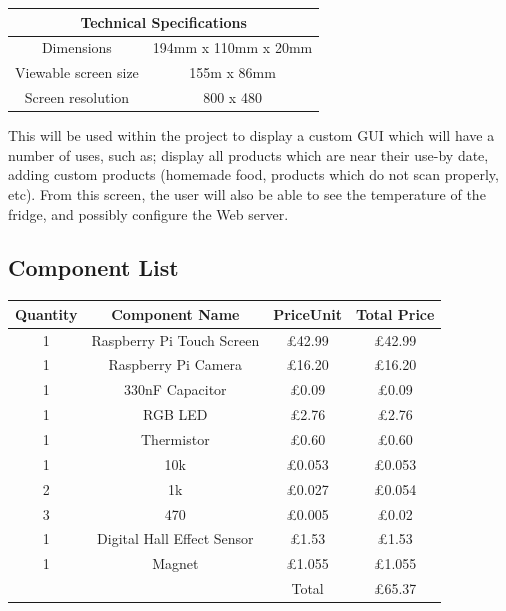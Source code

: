 \documentclass[10pt]{article}
\begin{document}
{\begin{center}
	\begin{tabular}{ | c | c | }
		\hline
	 	\multicolumn{2}{|c|}{Technical Specifications} \\ \hline
		Dimensions 		& 194mm x 110mm x 20mm \\ \hline
		Viewable screen size 	& 155m x 86mm \\ \hline
		Screen resolution	& 800 x 480 \\ \hline
	\end{tabular}
\end{center}

This will be used within the project to display a custom GUI which will have a number of uses, such as; display all products which are near their use-by date, adding custom products (homemade food, products which do not scan properly, etc). From this screen, the user will also be able to see the temperature of the fridge, and possibly configure the Web server.

\subsection{Component List}
\begin{center}
	\begin{tabular}{ | c | c | c | c |}
		\hline
	 	Quantity & Component Name & PriceUnit & Total Price \\ \hline
		1	& Raspberry Pi Touch Screen 	& \pounds 42.99	& \pounds 42.99 \\ \hline
		1 	& Raspberry Pi Camera 	& \pounds 16.20	& \pounds 16.20 \\ \hline
		1	& 330nF Capacitor	& \pounds 0.09	& \pounds 0.09 \\ \hline
		1	& RGB LED   & \pounds 2.76	& \pounds 2.76 \\ \hline
		1	& Thermistor	& \pounds 0.60	& \pounds 0.60 \\ \hline
		1	& 10k\ohm & \pounds 0.053 	& \pounds 0.053 \\ \hline
		2	& 1k\ohm & \pounds 0.027	& \pounds 0.054 \\ \hline
		3	& 470\ohm & \pounds 0.005	& \pounds 0.02 \\ \hline
		1	& Digital Hall Effect Sensor & \pounds 1.53	& \pounds 1.53 \\ \hline
		1	& Magnet & \pounds 1.055	& \pounds 1.055 \\ \hline
			& 	& Total 	& \pounds 65.37 \\ \hline
	\end{tabular}
\end{center}

}
\end{document}
